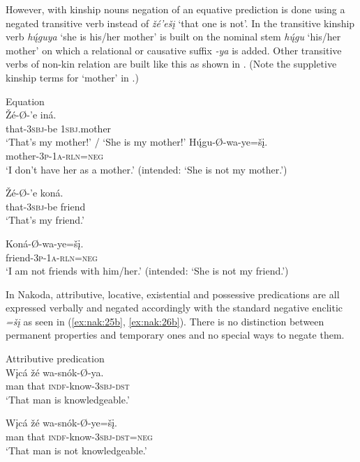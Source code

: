 \documentclass[output=paper,colorlinks,citecolor=brown]{langscibook}
\begin{document}
However, with kinship nouns negation of an equative prediction is done using a negated transitive verb instead of \textit{žé’ešį} ‘that one is not’. In  the transitive kinship verb \textit{h\'{ų}guya} ‘she is his/her mother’ is built on the nominal stem \textit{h\'{ų}gu} ‘his/her mother’ on which a relational or causative suffix \textit{-ya} is added. Other transitive verbs of non-kin relation are built like this as shown in . (Note the suppletive kinship terms for ‘mother’ in .)


\ea\label{ex:nak:23}{Equation}\\
    \ea\label{ex:nak:23a}
        \gll Žé-Ø-’e iná.  \\ 
             that-\textsc{3sbj}-be 1\textsc{sbj}.mother \\
        \glt ‘That’s my mother!’ / ‘She is my mother!’
    \ex\label{ex:nak:23b}
        \gll H\'{ų}gu-Ø-wa-ye=šį. \\
             mother\textsc{-3p-1a-rln=neg} \\
        \glt ‘I don’t have her as a mother.’ (intended: ‘She is not my mother.’)
    \z
\z 

\ea\label{ex:nak:24}
    \ea\label{ex:nak:24a}
        \gll Žé-Ø-’e koná. \\ 
             that-\textsc{3sbj}-be friend \\
        \glt ‘That’s my friend.’
    
    \ex\label{ex:nak:24b}
        \gll Koná-Ø-wa-ye=šį. \\
             friend-\textsc{3p}-\textsc{1a-rln=neg} \\
        \glt ‘I am not friends with him/her.’ (intended: ‘She is not my friend.’)
    \z
\z 

In Nakoda, attributive, locative, existential and possessive predications are all expressed verbally and negated accordingly with the standard negative enclitic \textit{=šį} as seen in (\ref{ex:nak:25b}, \ref{ex:nak:26b}). There is no distinction between permanent properties and temporary ones and no special ways to negate them.


\ea\label{ex:nak:25}{Attributive predication}\\
    \ea\label{ex:nak:25a}
        \gll Wįcá žé wa-snók-Ø-ya. \\
             man that \textsc{indf}-know-\textsc{3sbj-dst} \\
        \glt ‘That man is knowledgeable.’
    
    \ex\label{ex:nak:25b}
        \gll Wįcá žé wa-snók-Ø-ye=šį. \\
             man that \textsc{indf}-know-\textsc{3sbj-dst=neg} \\
        \glt ‘That man is not knowledgeable.’
    \z
\z 
\end{document}
